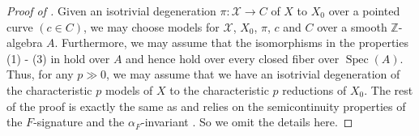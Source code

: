 \documentclass[11pt,reqno]{amsart}
\newcommand{\C}{\mathbb{C}}
\newcommand{\Q}{\mathbb{Q}}
\newcommand{\Z}{\mathbb{Z}}
\newcommand{\cL}{\mathcal{L}}
\newcommand{\cX}{\mathcal{X}}
\newcommand{\isom}{\cong}
\DeclareMathOperator{\Spec}{Spec}
\numberwithin{equation}{section}
\theoremstyle{definition}
\newcommand{\FA}{\alpha_{F}}
\begin{document}
\begin{proof}[Proof of ]
Given an isotrivial degeneration $\pi: \cX \to C$ of $X$ to $X_0$ over a pointed curve $(c \in C)$, we may choose models for $\cX$, $X_0$, $\pi$, $c$ and $C$ over a smooth $\Z$-algebra $A$. Furthermore, we may assume that the isomorphisms in the properties (1) - (3) in  hold over $A$ and hence hold over every closed fiber over $\Spec(A)$. Thus, for any $p \gg 0$, we may assume that we have an isotrivial degeneration of the characteristic $p$ models of $X$ to the characteristic $p $ reductions of $X_0$. The rest of the proof is exactly the same as  and relies on the semicontinuity properties of the $F$-signature and the $\FA$-invariant \cite[Theorem~5.8]{PandeFrobeniusAlpha}. So we omit the details here.
\end{proof}
\end{document}
